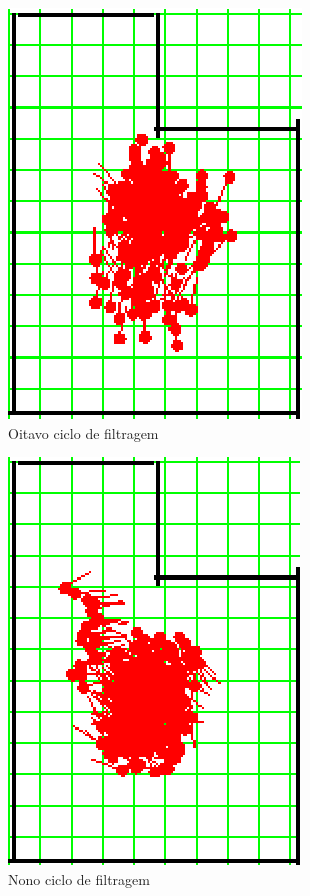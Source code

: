 \begin{figure}[H]
  \centering
  \includegraphics[scale=0.6]{figuras/cen1_ex3/9.eps}
  \caption[Oitavo Ciclo de Filtragem]{Oitavo ciclo de filtragem}
  \label{img:cen1_ex3_9}
\end{figure}

\begin{figure}[H]
  \centering
  \includegraphics[scale=0.6]{figuras/cen1_ex3/10.eps}
  \caption[Nono Ciclo de Filtragem]{Nono ciclo de filtragem}
  \label{img:cen1_ex3_10}
\end{figure}

